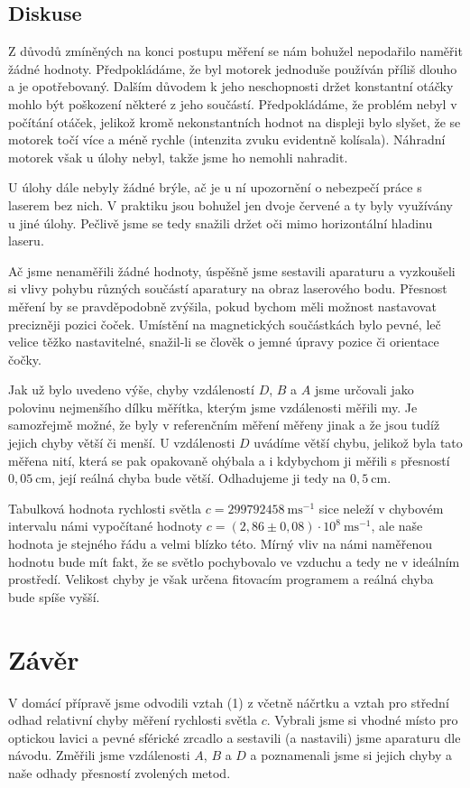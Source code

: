 \documentclass[english]{article}
\newcommand{\unit}[1]{\ \mathrm{#1}}
\begin{document}
  					
	\subsection{Diskuse}
		Z důvodů zmíněných na konci postupu měření se nám bohužel nepodařilo naměřit žádné hodnoty. Předpokládáme, že byl motorek jednoduše používán příliš dlouho a je opotřebovaný. Dalším důvodem k jeho neschopnosti držet konstantní otáčky mohlo být poškození některé z jeho součástí. Předpokládáme, že problém nebyl v počítání otáček, jelikož kromě nekonstantních hodnot na displeji bylo slyšet, že se motorek točí více a méně rychle (intenzita zvuku evidentně kolísala). Náhradní motorek však u úlohy nebyl, takže jsme ho nemohli nahradit.
		
		U úlohy dále nebyly žádné brýle, ač je u ní upozornění o nebezpečí práce s laserem bez nich. V praktiku jsou bohužel jen dvoje červené a ty byly využívány u jiné úlohy. Pečlivě jsme se tedy snažili držet oči mimo horizontální hladinu laseru.
		
		Ač jsme nenaměřili žádné hodnoty, úspěšně jsme sestavili aparaturu a vyzkoušeli si vlivy pohybu různých součástí aparatury na obraz laserového bodu. Přesnost měření by se pravděpodobně zvýšila, pokud bychom měli možnost nastavovat precizněji pozici čoček. Umístění na magnetických součástkách bylo pevné, leč velice těžko nastavitelné, snažil-li se člověk o jemné úpravy pozice či orientace čočky. 
		
		Jak už bylo uvedeno výše, chyby vzdáleností $D$, $B$ a $A$ jsme určovali jako polovinu nejmenšího dílku měřítka, kterým jsme vzdálenosti měřili my. Je samozřejmě možné, že byly v referenčním měření měřeny jinak a že jsou tudíž jejich chyby větší či menší. U vzdálenosti $D$ uvádíme větší chybu, jelikož byla tato měřena nití, která se pak opakovaně ohýbala a i kdybychom ji měřili s přesností $0,05\unit{cm}$, její reálná chyba bude větší. Odhadujeme ji tedy na $0,5\unit{cm}$. 
		
		Tabulková \cite{bib:tabulky} hodnota rychlosti světla $c = 299 792 458\unit{ms^{-1}}$ sice neleží v chybovém intervalu námi vypočítané hodnoty $c = (2,86\pm0,08)\cdot 10^8\unit{ms^{-1}}$, ale naše hodnota je stejného řádu a velmi blízko této. Mírný vliv na námi naměřenou hodnotu bude mít fakt, že se světlo pochybovalo ve vzduchu a tedy ne v ideálním prostředí. Velikost chyby je však určena fitovacím programem a reálná chyba bude spíše vyšší. 
	
\section{Závěr}
	V domácí přípravě jsme odvodili vztah (1) z \cite{bib:zadani} včetně náčrtku a vztah pro střední odhad relativní chyby měření rychlosti světla $c$. Vybrali jsme si vhodné místo pro optickou lavici a pevné sférické zrcadlo a sestavili (a nastavili) jsme aparaturu dle návodu. Změřili jsme vzdálenosti $A$, $B$ a $D$ a poznamenali jsme si jejich chyby a naše odhady přesností zvolených metod.
	
\end{document}
